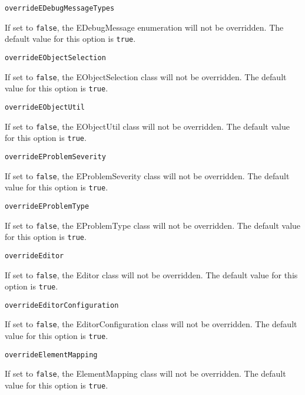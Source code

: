 \noindent\texttt{overrideEDebugMessageTypes}
\begin{myindentpar}{1cm}
If set to \texttt{false}, the EDebugMessage enumeration will not be overridden. The default value for this option is \texttt{true}.
\end{myindentpar}

\noindent\texttt{overrideEObjectSelection}
\begin{myindentpar}{1cm}
If set to \texttt{false}, the EObjectSelection class will not be overridden. The default value for this option is \texttt{true}.
\end{myindentpar}

\noindent\texttt{overrideEObjectUtil}
\begin{myindentpar}{1cm}
If set to \texttt{false}, the EObjectUtil class will not be overridden. The default value for this option is \texttt{true}.
\end{myindentpar}

\noindent\texttt{overrideEProblemSeverity}
\begin{myindentpar}{1cm}
If set to \texttt{false}, the EProblemSeverity class will not be overridden. The default value for this option is \texttt{true}.
\end{myindentpar}

\noindent\texttt{overrideEProblemType}
\begin{myindentpar}{1cm}
If set to \texttt{false}, the EProblemType class will not be overridden. The default value for this option is \texttt{true}.
\end{myindentpar}

\noindent\texttt{overrideEditor}
\begin{myindentpar}{1cm}
If set to \texttt{false}, the Editor class will not be overridden. The default value for this option is \texttt{true}.
\end{myindentpar}

\noindent\texttt{overrideEditorConfiguration}
\begin{myindentpar}{1cm}
If set to \texttt{false}, the EditorConfiguration class will not be overridden. The default value for this option is \texttt{true}.
\end{myindentpar}

\noindent\texttt{overrideElementMapping}
\begin{myindentpar}{1cm}
If set to \texttt{false}, the ElementMapping class will not be overridden. The default value for this option is \texttt{true}.
\end{myindentpar}

